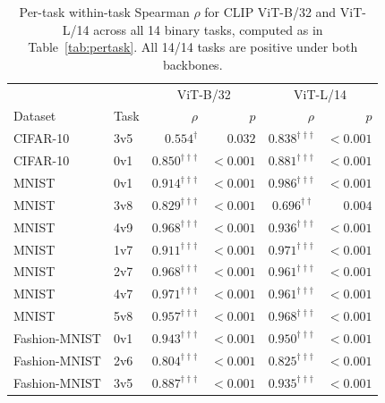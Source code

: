 \begin{table}[t]
  \centering
  \caption{Per-task within-task Spearman $\rho$ for CLIP ViT-B/32
    and ViT-L/14 across all 14 binary tasks, computed as in
    Table~\ref{tab:pertask}. All 14/14 tasks are positive under
    both backbones.}
  \label{tab:clip_pertask}
  \small
  \setlength{\tabcolsep}{4pt}
  \begin{tabular}{llrrrr}
    \toprule
    & & \multicolumn{2}{c}{ViT-B/32} & \multicolumn{2}{c}{ViT-L/14} \\
    Dataset & Task & $\rho$ & $p$ & $\rho$ & $p$ \\
    \midrule
    CIFAR-10     & 3v5            & $0.554^{{\dagger}}$ & $0.032$ & $0.838^{{\dagger\dagger\dagger}}$ & $<0.001$ \\
    CIFAR-10     & 0v1            & $0.850^{{\dagger\dagger\dagger}}$ & $<0.001$ & $0.881^{{\dagger\dagger\dagger}}$ & $<0.001$ \\
    \midrule
    MNIST        & 0v1            & $0.914^{{\dagger\dagger\dagger}}$ & $<0.001$ & $0.986^{{\dagger\dagger\dagger}}$ & $<0.001$ \\
    MNIST        & 3v8            & $0.829^{{\dagger\dagger\dagger}}$ & $<0.001$ & $0.696^{{\dagger\dagger}}$ & $0.004$ \\
    MNIST        & 4v9            & $0.968^{{\dagger\dagger\dagger}}$ & $<0.001$ & $0.936^{{\dagger\dagger\dagger}}$ & $<0.001$ \\
    MNIST        & 1v7            & $0.911^{{\dagger\dagger\dagger}}$ & $<0.001$ & $0.971^{{\dagger\dagger\dagger}}$ & $<0.001$ \\
    MNIST        & 2v7            & $0.968^{{\dagger\dagger\dagger}}$ & $<0.001$ & $0.961^{{\dagger\dagger\dagger}}$ & $<0.001$ \\
    MNIST        & 4v7            & $0.971^{{\dagger\dagger\dagger}}$ & $<0.001$ & $0.961^{{\dagger\dagger\dagger}}$ & $<0.001$ \\
    MNIST        & 5v8            & $0.957^{{\dagger\dagger\dagger}}$ & $<0.001$ & $0.968^{{\dagger\dagger\dagger}}$ & $<0.001$ \\
    \midrule
    Fashion-MNIST & 0v1            & $0.943^{{\dagger\dagger\dagger}}$ & $<0.001$ & $0.950^{{\dagger\dagger\dagger}}$ & $<0.001$ \\
    Fashion-MNIST & 2v6            & $0.804^{{\dagger\dagger\dagger}}$ & $<0.001$ & $0.825^{{\dagger\dagger\dagger}}$ & $<0.001$ \\
    Fashion-MNIST & 3v5            & $0.887^{{\dagger\dagger\dagger}}$ & $<0.001$ & $0.935^{{\dagger\dagger\dagger}}$ & $<0.001$ \\

\end{tabular}
\end{table}
